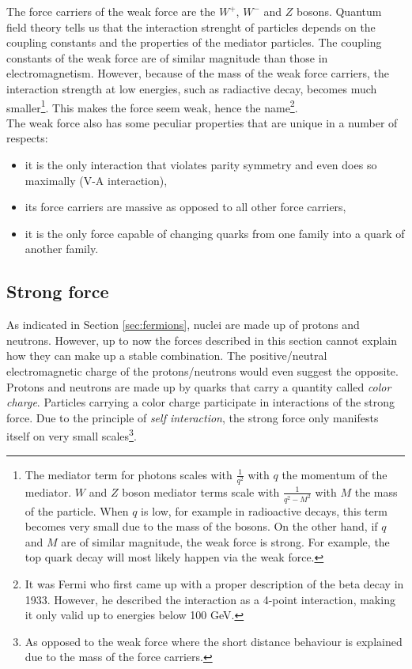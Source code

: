 The force carriers of the weak force are the $W^+$, $W^-$ and $Z$ bosons. 
Quantum field theory tells us that the interaction strenght of particles depends on the coupling constants and the properties of the mediator particles. The coupling constants of the weak force are of similar magnitude than those in electromagnetism. However, because of the mass of the weak force carriers, the interaction strength at low energies, such as radiactive decay, becomes much smaller\footnote{The mediator term for photons scales with $\frac{1}{q^2}$ with  $q$ the momentum of the mediator. $W$ and $Z$ boson mediator terms scale with $\frac{1}{q^2 - M^2}$ with $M$ the mass of the particle. When $q$ is low, for example in radioactive decays, this term becomes very small due to the mass of the bosons. On the other hand, if $q$ and $M$ are of similar magnitude, the weak force is strong. For example, the top quark decay will most likely happen via the weak force.}. This makes the force seem weak, hence the name\footnote{It was Fermi who first came up with a proper description of the beta decay in 1933. However, he described the interaction as a 4-point interaction, making it only valid up to energies below 100 GeV.}.\\
The weak force also has some peculiar properties that are unique in a number of respects:
\begin{itemize}
\item it is the only interaction that violates parity symmetry and even does so maximally (V-A interaction),
\item its force carriers are massive as opposed to all other force carriers,
\item it is the only force capable of changing quarks from one family into a quark of another family.
\end{itemize}

\subsection{Strong force}
\label{subsec:strong}
As indicated in Section \ref{sec:fermions}, nuclei are made up of protons and neutrons. However, up to now the forces described in this section cannot explain how they can make up a stable combination. The positive/neutral electromagnetic charge of the protons/neutrons would even suggest the opposite. Protons and neutrons are made up by quarks that carry a quantity called \textit{color charge}. Particles carrying a color charge participate in interactions of the strong force. Due to the principle of \textit{self interaction}, the strong force only manifests itself on very small scales\footnote{As opposed to the weak force where the short distance behaviour is explained due to the mass of the force carriers.}.

